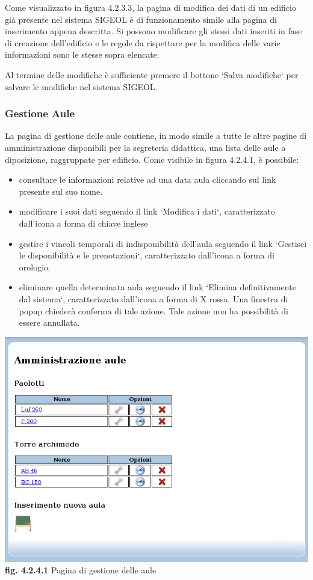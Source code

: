\documentclass[11pt,a4paper]{article}
\begin{document}
Come visualizzato in figura 4.2.3.3, la pagina di modifica dei dati di un edificio già presente nel sistema SIGEOL è di funzionamento simile alla pagina di inserimento appena descritta. Si possono modificare gli stessi dati inseriti in fase di creazione dell'edificio e le regole da rispettare per la modifica delle varie informazioni sono le stesse sopra elencate.

Al termine delle modifiche è sufficiente premere il bottone `Salva modifiche` per salvare le modifiche nel sistema SIGEOL.
\subsubsection{Gestione Aule}
La pagina di gestione delle aule contiene, in modo simile a tutte le altre pagine di amministrazione disponibili per la segreteria didattica, una lista delle aule a diposizione, raggruppate per edificio.
Come visibile in figura 4.2.4.1, è possibile:
\begin{itemize}
 \item consultare le informazioni relative ad una data aula cliccando sul link presente sul suo nome.
 \item modificare i suoi dati seguendo il link `Modifica i dati`, caratterizzato dall'icona a forma di chiave inglese
 \item gestire i vincoli temporali di indisponibilità dell'aula seguendo il link `Gestisci le disponibilità e le prenotazioni`, caratterizzato dall'icona a forma di orologio.
 \item eliminare quella determinata aula seguendo il link `Elimina definitivamente dal sistema`, caratterizzato dall'icona a forma di X rossa. Una finestra di popup chiederà conferma di tale azione. Tale azione non ha possibilità di essere annullata.
\end{itemize}

\bigskip
\begin{center}
	\includegraphics[scale=0.5]{images/amministrazione_aule.jpg}\\
	\textbf{fig. 4.2.4.1} Pagina di gestione delle aule\\
\end{center}
\bigskip
\end{document}
